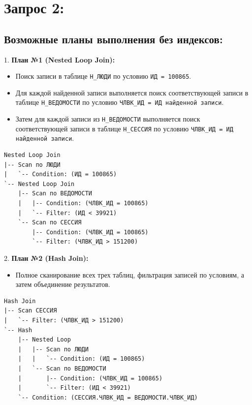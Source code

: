 \documentclass[14pt]{extreport}
\begin{document}
        \section*{Запрос 2:}

            \subsection*{Возможные планы выполнения без индексов:}

                1. \textbf{План №1 (Nested Loop Join):}
                \begin{itemize}
                    \item Поиск записи в таблице \texttt{Н\_ЛЮДИ} по условию \texttt{ИД = 100865}.
                    \item Для каждой найденной записи выполняется поиск соответствующей записи в таблице \texttt{Н\_ВЕДОМОСТИ} по условию \texttt{ЧЛВК\_ИД = ИД найденной записи}.
                    \item Затем для каждой записи из \texttt{Н\_ВЕДОМОСТИ} выполняется поиск соответствующей записи в таблице \texttt{Н\_СЕССИЯ} по условию \texttt{ЧЛВК\_ИД = ИД найденной записи}.
                \end{itemize}
                \begin{verbatim}
Nested Loop Join
|-- Scan по ЛЮДИ
|   `-- Сondition: (ИД = 100865)
`-- Nested Loop Join
    |-- Scan по ВЕДОМОСТИ
    |   |-- Condition: (ЧЛВК_ИД = 100865)
    |   `-- Filter: (ИД < 39921)
    `-- Scan по СЕССИЯ
        |-- Condition: (ЧЛВК_ИД = 100865)
        `-- Filter: (ЧЛВК_ИД > 151200)
                \end{verbatim}

                2. \textbf{План №2 (Hash Join):}
                \begin{itemize}
                    \item Полное сканирование всех трех таблиц, фильтрация записей по условиям, а затем объединение результатов.
                \end{itemize}
                \begin{verbatim}
Hash Join
|-- Scan СЕССИЯ
|   `-- Filter: (ЧЛВК_ИД > 151200)
`-- Hash
    |-- Nested Loop
    |   |-- Scan по ЛЮДИ
    |   |   `-- Condition: (ИД = 100865)
    |   `-- Scan по ВЕДОМОСТИ
    |       |-- Condition: (ЧЛВК_ИД = 100865)
    |       `-- Filter: (ИД < 39921)
    `-- Condition: (СЕССИЯ.ЧЛВК_ИД = ВЕДОМОСТИ.ЧЛВК_ИД)
                \end{verbatim}
\end{document}
